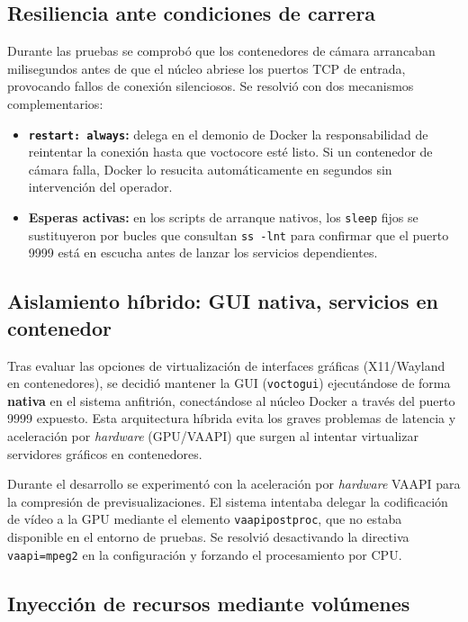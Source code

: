 \subsection{Resiliencia ante condiciones de carrera}

Durante las pruebas se comprobó que los contenedores de cámara arrancaban
milisegundos antes de que el núcleo abriese los puertos TCP de entrada,
provocando fallos de conexión silenciosos. Se resolvió con dos mecanismos
complementarios:

\begin{itemize}
  \item \textbf{\texttt{restart: always}:} delega en el demonio de Docker la
        responsabilidad de reintentar la conexión hasta que voctocore esté listo.
        Si un contenedor de cámara falla, Docker lo resucita automáticamente en
        segundos sin intervención del operador.
  \item \textbf{Esperas activas:} en los scripts de arranque nativos, los
        \texttt{sleep} fijos se sustituyeron por bucles que consultan
        \texttt{ss -lnt} para confirmar que el puerto 9999 está en escucha antes
        de lanzar los servicios dependientes.
\end{itemize}

\subsection{Aislamiento híbrido: GUI nativa, servicios en contenedor}

Tras evaluar las opciones de virtualización de interfaces gráficas (X11/Wayland
en contenedores), se decidió mantener la GUI (\texttt{voctogui}) ejecutándose
de forma \textbf{nativa} en el sistema anfitrión, conectándose al núcleo Docker
a través del puerto 9999 expuesto. Esta arquitectura híbrida evita los graves
problemas de latencia y aceleración por \textit{hardware} (GPU/VAAPI) que surgen al
intentar virtualizar servidores gráficos en contenedores.

Durante el desarrollo se experimentó con la aceleración por \textit{hardware} VAAPI para
la compresión de previsualizaciones. El sistema intentaba delegar la codificación
de vídeo a la GPU mediante el elemento \texttt{vaapipostproc}, que no estaba
disponible en el entorno de pruebas. Se resolvió desactivando la directiva
\texttt{vaapi=mpeg2} en la configuración y forzando el procesamiento por CPU.

\subsection{Inyección de recursos mediante volúmenes}

